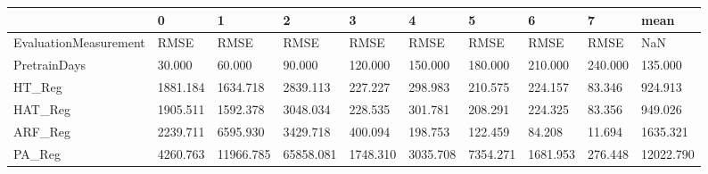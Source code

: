 \begin{tabular}{llllllllll}
\toprule
{} &        0 &         1 &         2 &        3 &        4 &        5 &        6 &       7 &      mean \\
\midrule
EvaluationMeasurement &     RMSE &      RMSE &      RMSE &     RMSE &     RMSE &     RMSE &     RMSE &    RMSE &       NaN \\
PretrainDays          &   30.000 &    60.000 &    90.000 &  120.000 &  150.000 &  180.000 &  210.000 & 240.000 &   135.000 \\
HT\_Reg                & 1881.184 &  1634.718 &  2839.113 &  227.227 &  298.983 &  210.575 &  224.157 &  83.346 &   924.913 \\
HAT\_Reg               & 1905.511 &  1592.378 &  3048.034 &  228.535 &  301.781 &  208.291 &  224.325 &  83.356 &   949.026 \\
ARF\_Reg               & 2239.711 &  6595.930 &  3429.718 &  400.094 &  198.753 &  122.459 &   84.208 &  11.694 &  1635.321 \\
PA\_Reg                & 4260.763 & 11966.785 & 65858.081 & 1748.310 & 3035.708 & 7354.271 & 1681.953 & 276.448 & 12022.790 \\
\bottomrule
\end{tabular}
